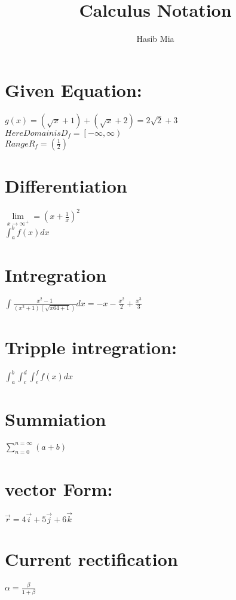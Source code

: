 \documentclass{article}
\author{Hasib Mia}
\title{Calculus Notation}
\begin{document}
	\maketitle
	
	\section{Given Equation:}
$	g(x)=(\sqrt{x}+1)+(\sqrt{x}+2)=2\sqrt{2}+3$
\\
$Here Domain is D_f=\left[ -\infty,\infty\right) $
\\
$Range R_f=(\frac{1}{2})$

	\section{Differentiation}

$\lim\limits_{x\to \infty^+}=(x+\frac{1}{x})^2$
\\
	$\int_{a}^{b}f(x)dx$
	\\
	\section{Intregration}
	$\int\frac{x^2-1}{(x^2+1)(\sqrt{x64+1})}dx=-x-\frac{x^2}{2}+\frac{x^3}{3}$
	\section{Tripple intregration: }
	$\int_{a}^{b}\int_{c}^{d}\int_{e}^{f}f(x)dx$
	\section{Summiation}
	$\sum\limits_{n=0}^{n=\infty}(a+b)$
	\section{vector Form:}
	$\vec{r}=4\vec{i}+5\vec{j}+6\vec{k}$
	\\
	\section{Current rectification}
	$     \alpha=\frac{\beta}{1+\beta}$
	
	
\end{document}
